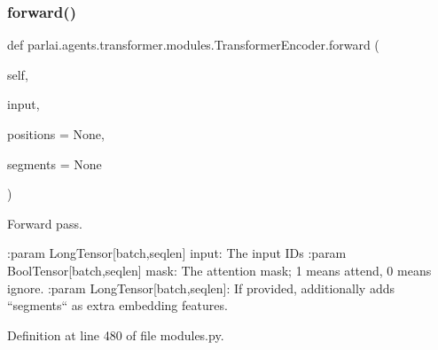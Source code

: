 \subsubsection{\texorpdfstring{forward()}{forward()}}
{\footnotesize\ttfamily def parlai.\+agents.\+transformer.\+modules.\+Transformer\+Encoder.\+forward (\begin{DoxyParamCaption}\item[{}]{self,  }\item[{}]{input,  }\item[{}]{positions = {\ttfamily None},  }\item[{}]{segments = {\ttfamily None} }\end{DoxyParamCaption})}

\begin{DoxyVerb}Forward pass.

:param LongTensor[batch,seqlen] input:
    The input IDs
:param BoolTensor[batch,seqlen] mask:
    The attention mask; 1 means attend, 0 means ignore.
:param LongTensor[batch,seqlen]:
    If provided, additionally adds ``segments`` as extra embedding features.
\end{DoxyVerb}
 

Definition at line 480 of file modules.\+py.


